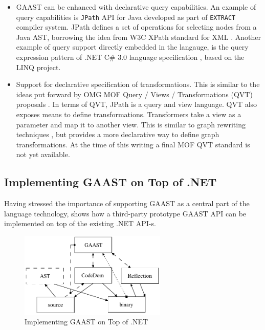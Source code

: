 \begin{itemize}
\item GAAST can be enhanced with declarative query capabilities. An example of query capabilities is {\tt JPath} API for Java developed as part of {\tt EXTRACT} \cite{extract} compiler system. JPath defines a set of operations for selecting nodes from a Java AST, borrowing the idea from W3C XPath \cite{url.xpath} standard for XML \cite{skonnardetal.01}. Another example of query support directly embedded in the langauge, is the query expression pattern of .NET C\# 3.0 language specification \cite{csh30}, based on the LINQ \cite{linq} project.

\item Support for declarative specification of transformations. This is similar to the ideas put forward by OMG MOF Query / Views / Transformations (QVT) proposals \cite{mof.qvt}. In terms of QVT, JPath is a query and view language. QVT also exposes means to define transformations. Transformers take a view as a parameter and map it to another view. This is similar to graph rewriting techniques \cite{term.rewrite,mens.99,gme.graphs}, but provides a more declarative way to define graph transformations. At the time of this writing a final MOF QVT standard is not yet available. 
\end{itemize}

\subsection{Implementing GAAST on Top of .NET}
\label{dnet.gaast}
Having stressed the importance of supporting GAAST as a central part of the language technology,  shows how a third-party prototype GAAST API can be implemented on top of the existing .NET API-s.

\begin{figure}[ht]
	\begin{center}
		\includegraphics[width=7cm,height=!]{ch03/third}
	\end{center}
	\caption{Implementing GAAST on Top of .NET}
	\label{fig.third}
\end{figure}

